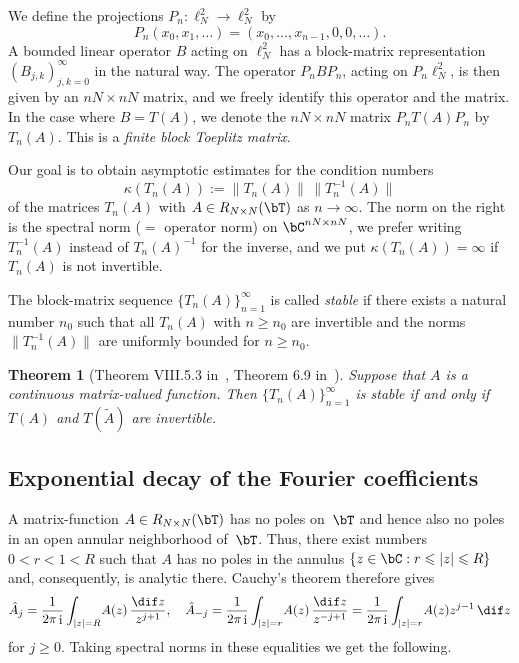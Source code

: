 \documentclass[addpoints,12pt,letter]{article}
\DeclareMathOperator{\mi}{i} %
\newcommand{\ka}{\kappa}
\newcommand{\nf}{\infty}
\newcommand{\ti}{\tilde}
\renewcommand{\ge}{\geqslant}
\renewcommand{\d}{\dif}
\renewcommand{\le}{\leqslant}
\numberwithin{equation}{section}
\newtheorem{theorem}[lemma]{Theorem}
\theoremstyle{definition}
\begin{document}
We define the projections $P_{n}:\ell_{N}^{2}\to\ell_{N}^{2}$ by
\[
P_{n}(x_{0},x_{1},\ldots)=(x_{0},\ldots,x_{n-1},0,0,\ldots).
\]
A bounded linear operator $B$ acting on $\ell_{N}^{2}$ has a block-matrix representation $(B_{j,k})_{j,k=0}^{\nf}$ in the natural way.
The operator $P_{n}BP_{n}$, acting on $P_{n}\ell_{N}^{2}$, is then given by an $nN\times nN$ matrix, and we freely identify this operator and the matrix.
In the case where $B=T(A)$, we denote the $nN\times nN$ matrix $P_{n}T(A)P_{n}$ by $T_{n}(A)$.
This is a {\em finite block Toeplitz matrix}.

Our goal is to obtain asymptotic estimates for the condition numbers
\[
\ka(T_{n}(A)):=\|T_{n}(A)\|\,\|T_{n}^{-1}(A)\|
\]
of the matrices $T_{n}(A)$ with $A\in R_{N\times N}(\bT)$ as $n\to\nf$.
The norm on the right is the spectral norm ($=$ operator norm) on $\bC^{nN\times nN}$, we prefer writing $T_{n}^{-1}(A)$ instead of $T_{n}(A)^{-1}$ for the inverse, and we put $\ka(T_{n}(A))=\nf$ if $T_{n}(A)$ is not invertible.

The block-matrix sequence $\{T_{n}(A)\}_{n=1}^{\nf}$ is called {\em stable} if there exists a natural number $n_{0}$ such that all $T_{n}(A)$ with $n\ge n_{0}$ are invertible and the norms $\|T_{n}^{-1}(A)\|$ are uniformly bounded for $n\ge n_{0}$.

\begin{theorem}[Theorem VIII.5.3 in~\cite{GoFe}, Theorem 6.9 in~\cite{BoSi99}]\label{th:Stable}
Suppose that $A$ is a continuous matrix-valued function.
Then $\{T_{n}(A)\}_{n=1}^{\nf}$ is stable if and only if $T(A)$ and $T(\ti{A})$ are invertible.
\end{theorem}

\subsection{Exponential decay of the Fourier coefficients}\label{ssec:prelim3}

A matrix-function $A\in R_{N \times N}(\bT)$ has no poles on~$\bT$ and hence also no poles in an open annular neighborhood of~$\bT$.
Thus, there exist numbers $0<r<1<R$ such that $A$ has no poles in the annulus $\{z\in\bC: r\le|z|\le R\}$ and, consequently, is analytic there.
Cauchy's theorem therefore gives
\[
\hat{A}_{j}=\frac{1}{2\pi \mi}\int_{|z|=R}\!A(z)\,\frac{\d z}{z^{j+1}}, \quad
\hat{A}_{-j}=\frac{1}{2\pi \mi}\int_{|z|=r}\! A(z)\,\frac{\d z}{z^{-j+1}}=\frac{1}{2\pi \mi}\int_{|z|=r}\! A(z)z^{j-1}\,\d z
\]
for $j\ge 0$.
Taking spectral norms in these equalities we get the following.
\end{document}

